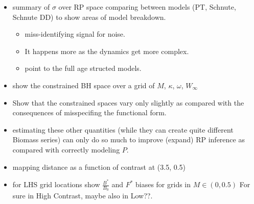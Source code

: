 \clearpage
\begin{itemize}
\item summary of $\sigma$ over RP space comparing between models (PT, Schnute, Schnute DD) to show areas of model breakdown.
	\begin{itemize}
	\item miss-identifying signal for noise. 
	\item It happens more as the dynamics get more complex. 
	\item point to the full age structed models.
	\end{itemize}

\item show the constrained BH space over a grid of $M$, $\kappa$, $\omega$, $W_\infty$
\item Show that the constrained spaces vary only slightly as compared with the consequences 
of misspecifing the functional form. 
\item estimating these other quantities (while they can create quite different Biomass series) 
can only do so much to improve (expand) RP inference as compared with correctly modeling $P$. 
\end{itemize}

%
 

\begin{itemize}
\item mapping distance as a function of contrast at (3.5, 0.5)

\item for LHS grid locations show $\frac{B^*}{B_0}$ and $F^*$ biases for grids in $M\in(0,0.5)$ For sure in High Contrast, maybe also in Low??.
\end{itemize}




%
\clearpage

%
